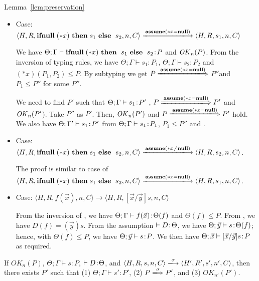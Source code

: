 \begin{pfof}{Lemma~\ref{lem:preservation}}
\begin{itemize}
\item Case: \(\langle H, R, \IFNULL \Sirx \ \THEN s_{1} \ \ELSE
  \ s_{2}, n, C\rangle \xlongrightarrow{\sassx} \langle H, R, s_{1}, n, C \rangle\)

  We have \(\Theta; \Gamma \vdash \mathbf{ifnull}\; (*x) \ \mathbf{then}\; \ s_{1}
  \ \mathbf{else}\; \ s_{2}\!:\! P\) and \(\mathit{OK}_{n}(P)\). From the inversion of
  typing rules, we have \(\Theta; \Gamma \vdash s_{1} : P_{1}\),
  \(\Theta; \Gamma \vdash s_{2} : P_{2}\) and \( (*x)(P_1,P_2) \le
  P\). By subtyping we get \(P \xLongrightarrow{\sassx} \) \(
  P''\)and \( P_1 \le P''\) for some \( P '' \).

  We need to find $P'$ such that \(\Theta; \Gamma \vdash s_1\!:\! P'\)
  , \(P \xLongrightarrow{\sassx} P'\) and \(\mathit{OK}_n(P'\)).  Take \(P''\) as
  \(P'\).  Then, \(\mathit{OK}_n(P')\) and \(P \xLongrightarrow{\sassx} P'\)
  hold. We also have \(\Theta; \Gamma' \vdash s_{1}\!:\! P'\) from
  \(\Theta; \Gamma \vdash s_{1}\!:\! P_1\), \(P_{1} \le P'' \) and
  .

\item Case: \(\langle H, R, \IFNULL \Sirx \ \THEN s_{1} \ \ELSE \ s_{2},
  n , C \rangle \xlongrightarrow{\sassxn} \langle H, R, s_{2}, n, C\rangle\).

 The proof is similar to case of  \(\langle H, R, \IFNULL \Sirx \ \THEN s_{1} \ \ELSE
  \ s_{2}, n, C \rangle \xlongrightarrow{\sassx} \langle H, R, s_{1}, n, C\rangle\).

\item Case: \( \langle H, R, f(\vec{x}) , n, C \rangle \rightarrow  \langle H, R, [\vec{x}/\vec{y}]s, n, C \rangle \)


From the inversion of , we have \(\Theta; \Gamma \vdash
f(\vec{x}) \!:\! \Theta(f)\) and \(\Theta(f) \le P\).  From
, we have \(D(f) = (\vec{y})s\).  From the assumption
\(\vdash D \!:\! \Theta\), we have \(\Theta; \vec{y} \vdash s \!:\!
\Theta(f)\); hence, with \(\Theta(f) \le P\), we have \(\Theta;
\vec{y} \vdash s \!:\! P\).  We then have \(\Theta; \vec{x} \vdash
    [\vec{x}/\vec{y}]s \!:\! P\) as required.

\end{itemize}
\end{pfof}  

\begin{corollary}
\label{cor:preservation}
If $OK_{n}(P)$, $\Theta; \Gamma \vdash s : P$, \(\vdash D \!:\!
\Theta\), and $\langle H,R,s,n,C\rangle \xlongrightarrow{\sigma}
\langle H',R',s', n', C \rangle$, then there exists $P'$ such that (1) $
\Theta; \Gamma \vdash s' : P'$, (2) \(P \xLongrightarrow{\sigma} P'\),
and (3) \(OK_{n'}(P')\).
\end{corollary}

